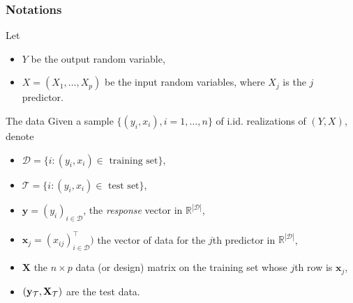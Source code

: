 \documentclass[10pt, c, xcolor=x11names]{beamer}\usepackage[]{graphicx}\usepackage[]{color}
\begin{document}
\begin{frame}
  \frametitle{Notations}

  Let
  \begin{itemize}
  \item $Y$ be the output random variable,
  \item  $X  =  (X_1,  \dots,  X_p)$  be  the  input  random
    variables, where $X_j$ is the $j$ predictor.
  \end{itemize}

  \vfill

  \begin{block}{The data}
    Given a sample $\{(y_i, x_i), i=1,\dots,n\}$ of i.id. realizations
    of $(Y,X)$, denote
    \begin{itemize}
    \item $\mathcal{D} = \{i:(y_i, x_i) \in \text{ training set}\}$,
    \item $\mathcal{T} = \{i:(y_i, x_i) \in \text{ test set}\}$,
    \item   $\mathbf{y}   =   (y_i)_{i\in\mathcal{D}}$,  the
      \emph{response} vector in $\mathbb{R}^{|\mathcal{D}|}$,
    \item $\mathbf{x}_j =  (x_{ij})_{i\in\mathcal{D}}^\intercal)$ the vector
      of data for the $j$th predictor in $\mathbb{R}^{|\mathcal{D}|}$,
    \item $\mathbf{X}$ the $n\times p$  data (or design) matrix on the
      training set whose $j$th row is $\mathbf{x}_j$,
    \item $(\mathbf{y}_\mathcal{T},\mathbf{X}_\mathcal{T})$ are the test data.
    \end{itemize}
  \end{block}
\end{frame}
\end{document}
